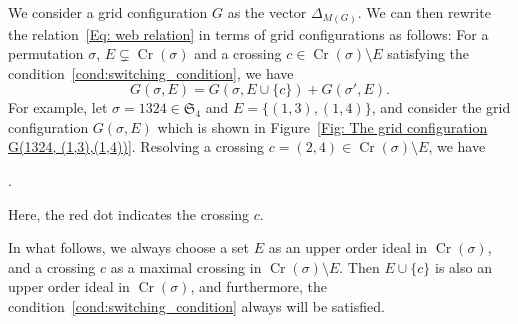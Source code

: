 \documentclass[reqno,12pt]{amsart}
\theoremstyle{definition}
\theoremstyle{remark}
\newcommand\Cr{\operatorname{Cr}}
\newcommand\Xmarking[2]
{\draw[very thick] (#1-0.7,#2-0.7)--(#1-0.3,#2-0.3);
\draw[very thick] (#1-0.7,#2-0.3)--(#1-0.3,#2-0.7);
\draw (#1-1,#2-0.5)--(#1-0.5,#2-0.5);
\draw (#1-0.5,#2-0.5)--(#1-0.5,#2); }
\newcommand\Cross[2]
{\draw (#1-0.5,#2)--(#1-0.5,#2-1);
\draw (#1,#2-0.5)--(#1-1,#2-0.5); }
\newcommand\UP[2]{\draw (#1-0.5,#2)--(#1-0.5,#2-1);}
\newcommand\EAST[2]{\draw (#1,#2-0.5)--(#1-1,#2-0.5);}
\newcommand\Asmooth[2]
{\draw (#1,#2-0.5) .. controls (#1-0.45,#2-0.45) and (#1-0.45,#2-0.45) .. (#1-0.5,#2);
\draw (#1-1,#2-0.5) .. controls (#1-0.55,#2-0.55) and (#1-0.55,#2-0.55) .. (#1-0.5,#2-1); }
\newcommand\SYM{\mathfrak{S}}
\begin{document}
We consider a grid configuration $G$ as the vector $\Delta_{M(G)}$.
We can then rewrite the relation~\eqref{Eq: web relation} in terms of grid
configurations as follows:
For a permutation \( \sigma \), \( E\subsetneq \Cr(\sigma) \)
and a crossing \( c\in\Cr(\sigma)\setminus E \) satisfying the
condition~\eqref{cond:switching_condition}, we have
\[
  G(\sigma,E) = G(\sigma,E\cup\{c\}) + G(\sigma', E).
\]
For example, let \( \sigma=1324\in\SYM_4 \) and \( E=\{(1,3),(1,4)\} \), and
consider the grid configuration \( G(\sigma, E) \) which is shown in
Figure~\ref{Fig: The grid configuration G(1324, (1,3),(1,4))}.
Resolving a crossing  \( c=(2,4)\in\Cr(\sigma)\setminus E \),
we have
\begin{center}
  .
\end{center}
Here, the red dot indicates the crossing \( c \).

In what follows, we always choose a set \( E \) as an upper order ideal in
\( \Cr(\sigma) \), and a crossing \( c \) as a maximal crossing in \( \Cr(\sigma)\setminus E \).
Then \( E\cup \{c\} \) is also an upper order ideal in \( \Cr(\sigma) \),
and furthermore, the condition~\eqref{cond:switching_condition} always will be
satisfied.
\end{document}
